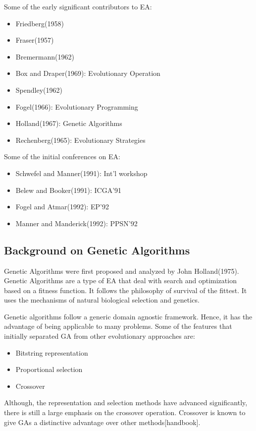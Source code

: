 \documentclass[12pt,a4paper]{article}
\begin{document}
	Some of the early significant contributors to EA:
	\begin{itemize}
	\item Friedberg(1958)
	\item Fraser(1957)
	\item Bremermann(1962)
	\item Box and Draper(1969): Evolutionary Operation
	\item Spendley(1962)
	\item Fogel(1966): Evolutionary Programming
	\item Holland(1967): Genetic Algorithms
	\item Rechenberg(1965): Evolutionary Strategies
	\end{itemize}
	
	Some of the initial conferences on EA:
	\begin{itemize}
	\item Schwefel and Manner(1991): Int'l workshop
	\item Belew and Booker(1991): ICGA'91
	\item Fogel and Atmar(1992): EP'92
	\item Manner and Manderick(1992): PPSN'92
	\end{itemize}
	
	\subsection{Background on Genetic Algorithms}
	Genetic Algorithms were first proposed and analyzed by John Holland(1975). Genetic Algorithms are a type of EA that deal with search and optimization based on a fitness function. It follows the philosophy of survival of the fittest. It uses the mechanisms of natural biological selection and genetics. \par
	Genetic algorithms follow a generic domain agnostic framework. Hence, it has the advantage of being applicable to many problems. Some of the features that initially separated GA from other evolutionary approaches are:
	\begin{itemize}	
	\item Bitstring representation
	\item Proportional selection
	\item Crossover
	\end{itemize}
	Although, the representation and selection methods have advanced significantly, there is still a large emphasis on the crossover operation. Crossover is known to give GAs a distinctive advantage over other methods[handbook]. \par
	
\end{document}
